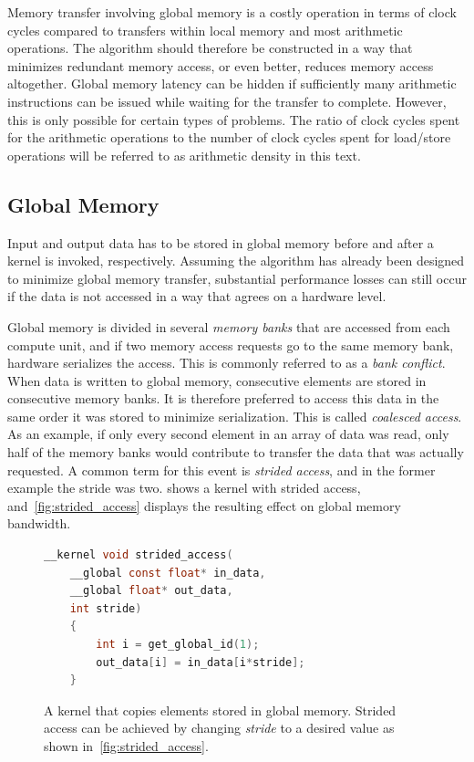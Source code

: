 \documentclass[11pt,twoside]{report}
\begin{document}
\indent Memory transfer involving  global memory is a costly operation in terms of clock cycles compared to transfers within local memory and most arithmetic operations. The algorithm should therefore be constructed in a way that minimizes redundant memory access, or even better, reduces memory access altogether. Global memory latency can be hidden if sufficiently many arithmetic instructions can be issued while waiting for the transfer to complete. However, this is only possible for certain types of problems. The ratio of clock cycles spent for the arithmetic operations to the number of clock cycles spent for load/store operations will be referred to as arithmetic density in this text.

\subsection{Global Memory}
\label{sec:global_mem}
Input and output data has to be stored in global memory before and after a kernel is invoked, respectively. Assuming the algorithm has already been designed to minimize global memory transfer, substantial performance losses can still occur if the data is not accessed in a way that agrees on a hardware level.

\indent Global memory is divided in several {\it memory banks} that are accessed from each compute unit, and if two memory access requests go to the same memory bank, hardware serializes the access. This is commonly referred to as a {\it bank conflict}. When data is written to global memory, consecutive elements are stored in consecutive memory banks. It is therefore preferred to access this data in the same order it was stored to minimize serialization. This is called {\it coalesced access}. As an example, if only every second element in an array of data was read, only half of the memory banks would contribute to transfer the data that was actually requested. A common term for this event is {\it strided access}, and in the former example the stride was two.  shows a kernel with strided access, and~\cref{fig:strided_access} displays the resulting effect on global memory bandwidth.

\begin{figure}[htbp]
	\vspace{-20pt}
	\begin{center}
	\begin{lstlisting}[language=C, style=my_C]
	__kernel void strided_access(
	__global const float* in_data,
	__global float* out_data,
	int stride)
	{	
		int i = get_global_id(1);
		out_data[i] = in_data[i*stride];
	}
	\end{lstlisting}
\caption{A kernel that copies elements stored in global memory. Strided access can be achieved by changing {\it stride} to a desired value as shown in~\cref{fig:strided_access}.\label{code:strided_access}}
\end{center}

\end{figure}
\end{document}

